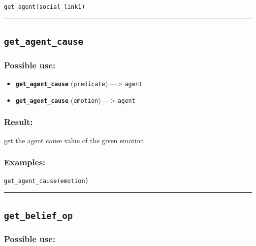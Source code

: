 \documentclass[]{book}
\providecommand{\tightlist}{%
  \setlength{\itemsep}{0pt}\setlength{\parskip}{0pt}}
\theoremstyle{definition}
\theoremstyle{definition}
\theoremstyle{definition}
\theoremstyle{remark}
\begin{document}
\begin{verbatim}
get_agent(social_link1) 
\end{verbatim}

\begin{center}\rule{0.5\linewidth}{\linethickness}\end{center}

\subsection{\texorpdfstring{\texttt{get\_agent\_cause}}{get\_agent\_cause}}\label{get_agent_cause}

\subsubsection{Possible use:}\label{possible-use-196}

\begin{itemize}
\tightlist
\item
  \textbf{\texttt{get\_agent\_cause}} (\texttt{predicate})
  ---\textgreater{} \texttt{agent}
\item
  \textbf{\texttt{get\_agent\_cause}} (\texttt{emotion})
  ---\textgreater{} \texttt{agent}
\end{itemize}

\subsubsection{Result:}\label{result-190}

get the agent cause value of the given emotion

\subsubsection{Examples:}\label{examples-143}

\begin{verbatim}
get_agent_cause(emotion) 
\end{verbatim}

\begin{center}\rule{0.5\linewidth}{\linethickness}\end{center}

\subsection{\texorpdfstring{\texttt{get\_belief\_op}}{get\_belief\_op}}\label{get_belief_op}

\subsubsection{Possible use:}\label{possible-use-197}
\end{document}
